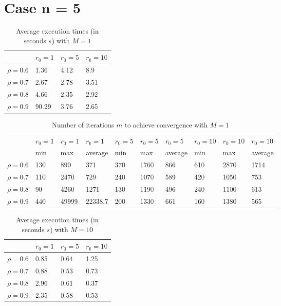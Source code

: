 \documentclass[a4paper,11pt,openright]{report}
\begin{document}
\section*{Case n = 5} 
\begin{table}[H]
\centering
\addtolength{\leftskip}{-1.5cm}
\addtolength{\rightskip}{-1.5cm}
\begin{tabular}{|c|lll|}
\hline
$ $ & $r_0 = 1$ & $r_0 = 5$ & $r_0 = 10$ \\
\hline
$\rho = 0.6$ & 1.36 & 4.12 & 8.9 \\

$\rho = 0.7$ & 2.67 & 2.78 & 3.51 \\

$\rho = 0.8$ & 4.66 & 2.35 & 2.92 \\

$\rho = 0.9$ & 90.29 & 3.76 & 2.65 \\
\hline
\end{tabular}
\caption{Average execution
 times (in seconds $s$) with $M = 1$}
\end{table}
\begin{table}[H]
\centering
\addtolength{\leftskip}{-1.5cm}
\addtolength{\rightskip}{-1.5cm}
\begin{tabular}{|c|lllllllll|}
\hline
$ $ & $r_0 = 1$ & $r_0 = 1$ & $r_0 = 1$ & $r_0 = 5$ & $r_0 = 5$ & $r_0 = 5$ & $r_0 = 10$ & $r_0 = 10$ & $r_0 = 10$  \\
$ $ & min & max & average & min & max & average & min & max & average \\ 
\hline
$\rho = 0.6$ & 130 & 890 & 371 & 370 & 1760 & 866 & 610 & 2870 & 1714 \\

$\rho = 0.7$ & 110 & 2470 & 729 & 240 & 1070 & 589 & 420 & 1050 & 753\\

$\rho = 0.8$ & 90 & 4260 & 1271 & 130 & 1190 & 496 & 240 & 1100 & 613\\

$\rho = 0.9$ & 440 & 49999 & 22338.7 & 200 & 1330 & 661 & 160 & 1380 & 565\\
\hline
\end{tabular}
\caption{Number of iterations $m$ to achieve convergence with $M = 1$}
\end{table}
\begin{table}[H]
\centering
\addtolength{\leftskip}{-1.5cm}
\addtolength{\rightskip}{-1.5cm}
\begin{tabular}{|c|lll|}
\hline
$ $ & $r_0 = 1$ & $r_0 = 5$ & $r_0 = 10$ \\
\hline
$\rho = 0.6$ & 0.85 & 0.64 & 1.25 \\

$\rho = 0.7$ & 0.88 & 0.53 & 0.73 \\

$\rho = 0.8$ & 2.96 & 0.61 & 0.37 \\

$\rho = 0.9$ & 2.35 & 0.58 & 0.53 \\
\hline
\end{tabular}
\caption{Average execution
 times (in seconds $s$) with $M = 10$}
\end{table}
\end{document}
